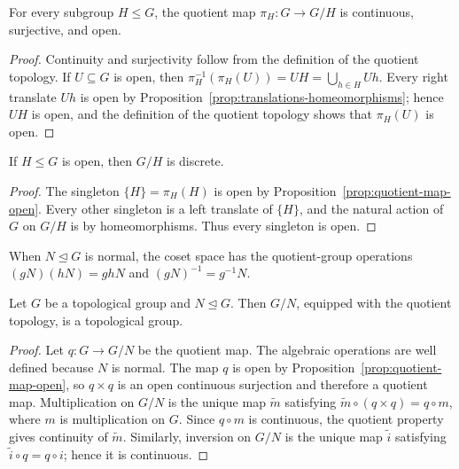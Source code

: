 \begin{proposition}
    \label{prop:quotient-map-open}
    For every subgroup \(H\leq G\), the quotient map
    \(\pi_H\colon G\to G/H\) is continuous, surjective, and open.
\end{proposition}

\begin{proof}
    Continuity and surjectivity follow from the definition of the quotient
    topology.  If \(U\subseteq G\) is open, then
    \(\pi_H^{-1}(\pi_H(U))=UH=\bigcup_{h\in H}Uh\).  Every right translate
    \(Uh\) is open by Proposition~\ref{prop:translations-homeomorphisms};
    hence \(UH\) is open, and the definition of the quotient topology shows
    that \(\pi_H(U)\) is open.
\end{proof}

\begin{corollary}
    \label{cor:open-subgroup-discrete-cosets}
    If \(H\leq G\) is open, then \(G/H\) is discrete.
\end{corollary}

\begin{proof}
    The singleton \(\{H\}=\pi_H(H)\) is open by
    Proposition~\ref{prop:quotient-map-open}.  Every other singleton is a left
    translate of \(\{H\}\), and the natural action of \(G\) on \(G/H\) is by
    homeomorphisms.  Thus every singleton is open.
\end{proof}

When \(N\trianglelefteq G\) is normal, the coset space has the quotient-group
operations \((gN)(hN)=ghN\) and \((gN)^{-1}=g^{-1}N\).

\begin{proposition}
    \label{prop:quotient-group}
    Let \(G\) be a topological group and \(N\trianglelefteq G\).  Then \(G/N\),
    equipped with the quotient topology, is a topological group.
\end{proposition}

\begin{proof}
    Let \(q\colon G\to G/N\) be the quotient map.  The algebraic operations are
    well defined because \(N\) is normal.  The map \(q\) is open by
    Proposition~\ref{prop:quotient-map-open}, so \(q\times q\) is an open
    continuous surjection and therefore a quotient map.  Multiplication on
    \(G/N\) is the unique map \(\widetilde m\) satisfying
    \(\widetilde m\circ(q\times q)=q\circ m\), where \(m\) is multiplication
    on \(G\).  Since \(q\circ m\) is continuous, the quotient property gives
    continuity of \(\widetilde m\).  Similarly, inversion on \(G/N\) is the
    unique map \(\widetilde i\) satisfying \(\widetilde i\circ q=q\circ i\);
    hence it is continuous.
\end{proof}

